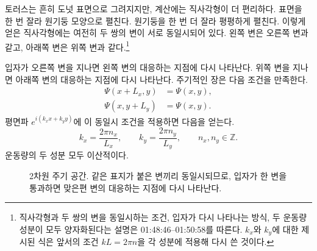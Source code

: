 토러스는 흔히 도넛 표면으로 그려지지만, 계산에는 직사각형이 더 편리하다. 표면을 한 번 잘라 원기둥 모양으로 펼친다. 원기둥을 한 번 더 잘라 평평하게 펼친다. 이렇게 얻은 직사각형에는 여전히 두 쌍의 변이 서로 동일시되어 있다. 왼쪽 변은 오른쪽 변과 같고, 아래쪽 변은 위쪽 변과 같다.\footnote{직사각형과 두 쌍의 변을 동일시하는 조건, 입자가 다시 나타나는 방식, 두 운동량 성분이 모두 양자화된다는 설명은 01:48:46--01:50:58를 따른다. \(k_x\)와 \(k_y\)에 대한 제시된 식은 앞서의 조건 \(kL=2\pi n\)을 각 성분에 적용해 다시 쓴 것이다.}

입자가 오른쪽 변을 지나면 왼쪽 변의 대응하는 지점에 다시 나타난다. 위쪽 변을 지나면 아래쪽 변의 대응하는 지점에 다시 나타난다. 주기적인 장은 다음 조건을 만족한다.
\begin{align}
\Psi(x+L_x,y)&=\Psi(x,y),\\
\Psi(x,y+L_y)&=\Psi(x,y).
\end{align}
평면파 \(e^{i(k_x x+k_y y)}\)에 이 동일시 조건을 적용하면 다음을 얻는다.
\begin{equation}
k_x=\frac{2\pi n_x}{L_x},
\qquad
k_y=\frac{2\pi n_y}{L_y},
\qquad
n_x,n_y\in\mathbb Z.
\end{equation}
운동량의 두 성분 모두 이산적이다.

\begin{figure}[t]\centering
{}\caption{2차원 주기 공간. 같은 표지가 붙은 변끼리 동일시되므로, 입자가 한 변을 통과하면 맞은편 변의 대응하는 지점에 다시 나타난다.}\end{figure}

\begin{classroomqa}\end{classroomqa}

